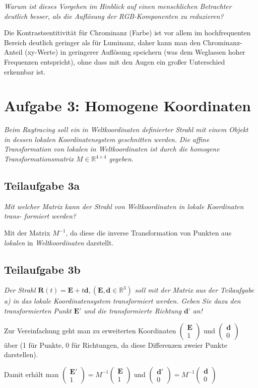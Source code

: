 \documentclass[a4paper]{scrartcl}
\begin{document}
\textit{Warum ist dieses Vorgehen im Hinblick auf einen menschlichen Betrachter deutlich
besser, als die Auflösung der RGB-Komponenten zu reduzieren?}

Die Kontrastsentitivität für Chrominanz (Farbe) ist vor allem im hochfrequenten Bereich deutlich geringer als für Luminanz, daher kann man den Chrominanz-Anteil (xy-Werte) in geringerer Auflösung speichern (was dem Weglassen hoher Frequenzen entspricht), ohne dass mit den Augen ein großer Unterschied erkennbar ist.

\section*{Aufgabe 3: Homogene Koordinaten}
\textit{Beim Raytracing soll ein in Weltkoordinaten definierter Strahl mit einem Objekt in dessen
lokalen Koordinatensystem geschnitten werden. Die affine Transformation von lokalen in
Weltkoordinaten ist durch die homogene Transformationsmatrix $M \in \mathbb{R}^{4\times 4}$ gegeben.}
\subsection*{Teilaufgabe 3a}
\textit{Mit welcher Matrix kann der Strahl von Weltkoordinaten in lokale Koordinaten trans-
formiert werden?}

Mit der Matrix $M^{-1}$, da diese die inverse Transformation von Punkten aus \textit{lokalen} in \textit{Weltkoordinaten} darstellt.
\subsection*{Teilaufgabe 3b}
\textit{Der Strahl $\mathbf{R}(t) = \mathbf{E} + t \mathbf{d}, (\mathbf{E}, \mathbf{d} \in \mathbb{R}^3 )$ soll mit der Matrix aus der Teilaufgabe a) in das
lokale Koordinatensystem transformiert werden. Geben Sie dazu den transformierten
Punkt $\mathbf{E'}$ und die transformierte Richtung $\textbf{d'}$ an!}

Zur Vereinfachung geht man zu erweiterten Koordinaten $\begin{pmatrix}
\mathbf{E}\\1
\end{pmatrix}$ und $\begin{pmatrix}
\mathbf{d}\\0
\end{pmatrix}$ über (1 für Punkte, 0 für Richtungen, da diese Differenzen zweier Punkte darstellen).

Damit erhält man $\begin{pmatrix}
\mathbf{E'}\\1
\end{pmatrix} = M^{-1} \begin{pmatrix}
\mathbf{E}\\1
\end{pmatrix}$ und $\begin{pmatrix}
\mathbf{d'}\\0
\end{pmatrix} = M^{-1} \begin{pmatrix}
\mathbf{d}\\0
\end{pmatrix}$
\end{document}
